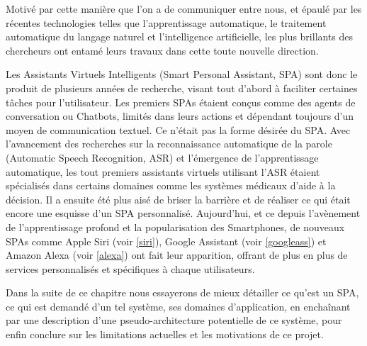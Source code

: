 \par 
Motivé par cette manière que l'on a de communiquer entre nous, et épaulé par les récentes technologies telles que l'apprentissage automatique, le traitement automatique du langage naturel et l'intelligence artificielle, les plus brillants des chercheurs ont entamé leurs travaux dans cette toute nouvelle direction.
\par 
Les Assistants Virtuels Intelligents (Smart Personal Assistant, SPA) sont donc le produit de plusieurs années de recherche, visant tout d'abord à faciliter certaines tâches pour l'utilisateur. Les premiers SPAs étaient conçus comme des agents de conversation ou Chatbots, limités dans leurs actions et dépendant toujours d'un moyen de communication textuel. Ce n'était pas la forme désirée du SPA. Avec l'avancement des recherches sur la reconnaissance automatique de la parole (Automatic Speech Recognition, ASR) et l'émergence de l'apprentissage automatique, les tout premiers assistants virtuels utilisant l'ASR étaient spécialisés dans certains domaines comme les systèmes médicaux d'aide à la décision. Il a ensuite été plus aisé de briser la barrière et de réaliser ce qui était encore une esquisse d'un SPA personnalisé. Aujourd'hui, et ce depuis l'avènement de l'apprentissage profond et la popularisation des Smartphones, de nouveaux SPAs comme Apple Siri (voir \ref{siri}), Google Assistant (voir \ref{googleass}) et Amazon Alexa (voir \ref{alexa}) ont fait leur apparition, offrant de plus en plus de services personnalisés et spécifiques à chaque utilisateurs.
\par 

Dans la suite de ce chapitre nous essayerons de mieux détailler ce qu'est un SPA, ce qui est demandé d'un tel système, ses domaines d'application, en enchaînant par une description d'une pseudo-architecture potentielle de ce système, pour enfin  conclure sur les limitations actuelles et les motivations de ce projet. 

